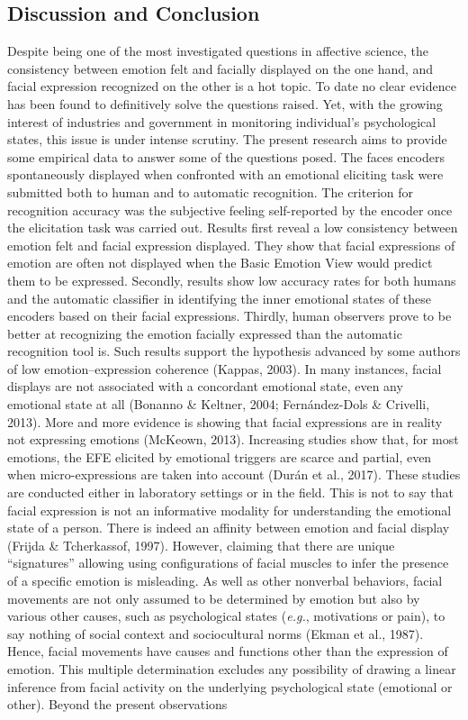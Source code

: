 \documentclass[man]{apa6}
\begin{document}
\hypertarget{discussion-and-conclusion}{%
\subsection{Discussion and Conclusion}\label{discussion-and-conclusion}}

Despite being one of the most investigated questions in affective science, the consistency between emotion felt and facially displayed on the one hand, and facial expression recognized on the other is a hot topic. To date no clear evidence has been found to definitively solve the questions raised. Yet, with the growing interest of industries and government in monitoring individual's psychological states, this issue is under intense scrutiny. The present research aims to provide some empirical data to answer some of the questions posed. The faces encoders spontaneously displayed when confronted with an emotional eliciting task were submitted both to human and to automatic recognition. The criterion for recognition accuracy was the subjective feeling self-reported by the encoder once the elicitation task was carried out. Results first reveal a low consistency between emotion felt and facial expression displayed. They show that facial expressions of emotion are often not displayed when the Basic Emotion View would predict them to be expressed. Secondly, results show low accuracy rates for both humans and the automatic classifier in identifying the inner emotional states of these encoders based on their facial expressions. Thirdly, human observers prove to be better at recognizing the emotion facially expressed than the automatic recognition tool is. Such results support the hypothesis advanced by some authors of low emotion--expression coherence (Kappas, 2003). In many instances, facial displays are not associated with a concordant emotional state, even any emotional state at all (Bonanno \& Keltner, 2004; Fernández-Dols \& Crivelli, 2013). More and more evidence is showing that facial expressions are in reality not expressing emotions (McKeown, 2013). Increasing studies show that, for most emotions, the EFE elicited by emotional triggers are scarce and partial, even when micro-expressions are taken into account (Durán et al., 2017). These studies are conducted either in laboratory settings or in the field. This is not to say that facial expression is not an informative modality for understanding the emotional state of a person. There is indeed an affinity between emotion and facial display (Frijda \& Tcherkassof, 1997). However, claiming that there are unique \enquote{signatures} allowing using configurations of facial muscles to infer the presence of a specific emotion is misleading. As well as other nonverbal behaviors, facial movements are not only assumed to be determined by emotion but also by various other causes, such as psychological states (\emph{e.g.}, motivations or pain), to say nothing of social context and sociocultural norms (Ekman et al., 1987). Hence, facial movements have causes and functions other than the expression of emotion. This multiple determination excludes any possibility of drawing a linear inference from facial activity on the underlying psychological state (emotional or other). Beyond the present observations 
\end{document}

